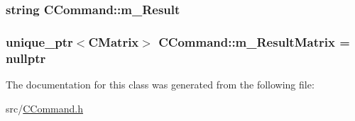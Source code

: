 \subsubsection[{\texorpdfstring{m\+\_\+\+Result}{m_Result}}]{\setlength{\rightskip}{0pt plus 5cm}string C\+Command\+::m\+\_\+\+Result}\hypertarget{classCCommand_a95d58d40a428b703b727d8f847e6de1e}{}\label{classCCommand_a95d58d40a428b703b727d8f847e6de1e}
\subsubsection[{\texorpdfstring{m\+\_\+\+Result\+Matrix}{m_ResultMatrix}}]{\setlength{\rightskip}{0pt plus 5cm}unique\+\_\+ptr$<${\bf C\+Matrix}$>$ C\+Command\+::m\+\_\+\+Result\+Matrix = nullptr}\hypertarget{classCCommand_a5192105298cdb9ea3ef5c3d3aaeba50e}{}\label{classCCommand_a5192105298cdb9ea3ef5c3d3aaeba50e}


The documentation for this class was generated from the following file\+:\begin{DoxyCompactItemize}
\item 
src/\hyperlink{CCommand_8h}{C\+Command.\+h}\end{DoxyCompactItemize}
